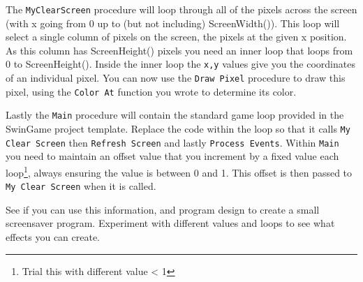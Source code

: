 \begin{enumerate}
The \texttt{MyClearScreen} procedure will loop through all of the pixels across the screen (with x going from 0 up to (but not including) ScreenWidth()). This loop will select a single column of pixels on the screen, the pixels at the given x position. As this column has ScreenHeight() pixels you need an inner loop that loops from 0 to ScreenHeight(). Inside the inner loop the \texttt{x,y} values give you the coordinates of an individual pixel. You can now use the \texttt{Draw Pixel} procedure to draw this pixel, using the \texttt{Color At} function you wrote to determine its color.

Lastly the \texttt{Main} procedure will contain the standard game loop provided in the SwinGame project template. Replace the code within the loop so that it calls \texttt{My Clear Screen} then \texttt{Refresh Screen} and lastly \texttt{Process Events}. Within \texttt{Main} you need to maintain an offset value that you increment by a fixed value each loop\footnote{Trial this with different value < 1}, always ensuring the value is between 0 and 1. This offset is then passed to \texttt{My Clear Screen} when it is called.

See if you can use this information, and program design to create a small screensaver program. Experiment with different values and loops to see what effects you can create.
\end{enumerate}


